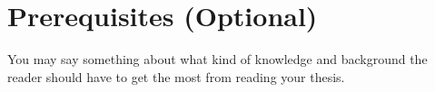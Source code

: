 \chapter*{Prerequisites (Optional)}
\label{chap:prerequisitest}

You may say something about what kind of knowledge and background the reader should have to get the most from reading your thesis. 